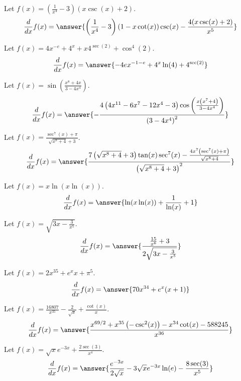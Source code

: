 \documentclass{ximera}
\begin{document}
\begin{shuffle}
\begin{exercise}
Let $f(x)=\left(\frac{1}{x^4}-3\right) (x \csc (x)+2)$.
\[
\ddx f(x) = \answer{\left(\frac{1}{x^4}-3\right) (1-x \cot (x)) \csc (x)-\frac{4 (x \csc (x)+2)}{x^5}}
\]
\end{exercise}

\begin{exercise}
Let $f(x)=4 x^{-e}+4^x+x 4^{\sec (2)}+\cos ^4(2)$.
\[
\ddx f(x) = \answer{-4 e x^{-1-e}+4^x \ln (4)+4^{\sec (2)}}
\]
\end{exercise}

\begin{exercise}
Let $f(x)=\sin \left(\frac{x^8+4 x}{3-4 x^4}\right)$.
\[
\ddx f(x) = \answer{-\frac{4 \left(4 x^{11}-6 x^7-12 x^4-3\right) \cos \left(\frac{x \left(x^7+4\right)}{3-4 x^4}\right)}{\left(3-4 x^4\right)^2}}
\]
\end{exercise}

\begin{exercise}
Let $f(x)=\frac{\sec ^7(x)+\pi }{\sqrt{x^8+4}+3}$.
\[
\ddx f(x) = \answer{\frac{7 \left(\sqrt{x^8+4}+3\right) \tan (x) \sec ^7(x)-\frac{4 x^7 \left(\sec ^7(x)+\pi \right)}{\sqrt{x^8+4}}}{\left(\sqrt{x^8+4}+3\right)^2}}
\]
\end{exercise}

\begin{exercise}
Let $f(x)=x \ln (x \ln (x))$.
\[
\ddx f(x) = \answer{\ln (x \ln (x))+\frac{1}{\ln (x)}+1}
\]
\end{exercise}

\begin{exercise}
Let $f(x)=\sqrt{3 x-\frac{3}{x^5}}$.
\[
\ddx f(x) = \answer{\frac{\frac{15}{x^6}+3}{2 \sqrt{3 x-\frac{3}{x^5}}}}
\]
\end{exercise}

\begin{exercise}
Let $f(x)=2 x^{35}+e^x x+\pi ^5$.
\[
\ddx f(x) = \answer{70 x^{34}+e^x (x+1)}
\]
\end{exercise}

\begin{exercise}
Let $f(x)=\frac{16807}{x^{35}}-\frac{2}{\sqrt{x}}+\frac{\cot (x)}{x}$.
\[
\ddx f(x) = \answer{\frac{x^{69/2}+x^{35} \left(-\csc ^2(x)\right)-x^{34} \cot (x)-588245}{x^{36}}}
\]
\end{exercise}

\begin{exercise}
Let $f(x)=\sqrt{x} e^{-3 x}+\frac{2 \sec (3)}{x^4}$.
\[
\ddx f(x) = \answer{\frac{e^{-3 x}}{2 \sqrt{x}}-3 \sqrt{x} e^{-3 x} \ln (e)-\frac{8 \sec (3)}{x^5}}
\]
\end{exercise}


\end{shuffle}
\end{document}
